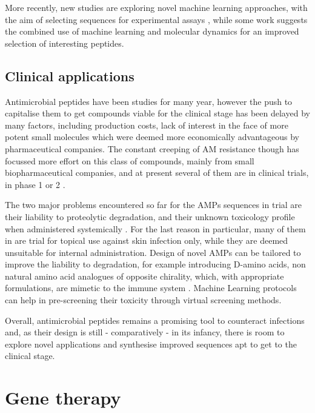 More recently, new studies are exploring novel machine learning approaches, with the aim of selecting sequences for experimental assays \cite{Lee2017}, while some work suggests the combined use of machine learning and molecular dynamics for an improved selection of interesting peptides.

\subsection{Clinical applications}
Antimicrobial peptides have been studies for many year, however the push to capitalise them to get compounds viable for the clinical stage has been delayed by many factors, including production costs, lack of interest in the face of more potent small molecules which were deemed more economically advantageous by pharmaceutical companies.
%
The constant creeping of AM resistance though has focussed more effort on this class of compounds, mainly from small biopharmaceutical companies, and at present several of them are in clinical trials, in phase 1 or 2 \cite{Naafs2018}.

The two major problems encountered so far for the AMPs sequences in trial are their liability to proteolytic degradation, and their unknown toxicology profile when administered systemically \cite{Hancock2006}. For the last reason in particular, many of them in are trial for topical use against skin infection only, while they are deemed unsuitable for internal administration.
%
Design of novel AMPs can be tailored to improve the liability to degradation, for example introducing D-amino acids, non ­natural amino ­acid analogues of opposite chirality, which, with appropriate formulations, are mimetic to the immune system \cite{Wipf2009,Choudhary2011}. Machine Learning protocols can help in pre-screening their toxicity through virtual screening methods.

Overall, antimicrobial peptides remains a promising tool to counteract infections and, as their design is still - comparatively - in its infancy, there is room to explore novel applications and synthesise improved sequences apt to get to the clinical stage.


\section{Gene therapy}


